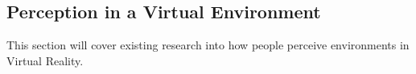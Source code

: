		
	\subsection{Perception in a Virtual Environment}
	\label{lr:vr:perception}
		This section will cover existing research into how people perceive environments in Virtual Reality.
		
